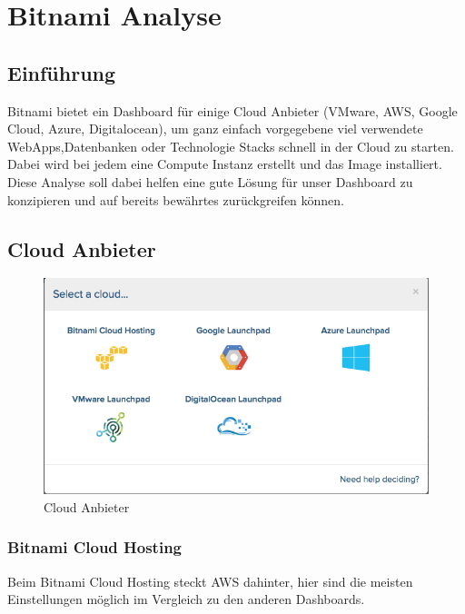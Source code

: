 \newpage
\section{Bitnami Analyse}
\subsection{Einführung}
 
Bitnami bietet ein Dashboard für einige Cloud Anbieter (VMware, AWS, Google Cloud, Azure, 
Digitalocean), um ganz einfach vorgegebene viel verwendete WebApps,Datenbanken oder Technologie Stacks 
schnell in der Cloud zu starten.
Dabei wird bei jedem eine Compute Instanz erstellt und das Image installiert.
Diese Analyse soll dabei helfen eine gute Lösung für unser Dashboard zu 
konzipieren und auf bereits bewährtes zurückgreifen können.

\subsection{Cloud Anbieter}
\begin{figure}[!htbp]
\includegraphics[width=\textwidth]{./03_Analyse/03_Bitnami/images/clouds}
  \caption{Cloud Anbieter}
\end{figure}

\newpage
\subsubsection{Bitnami Cloud Hosting\autocite{aws}}

Beim Bitnami Cloud Hosting steckt AWS dahinter, hier sind die meisten 
Einstellungen möglich im Vergleich zu den anderen Dashboards.

